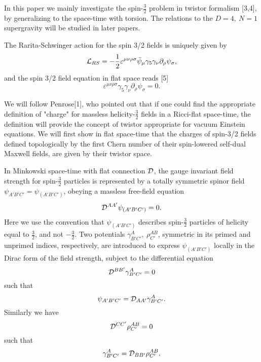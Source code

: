 \documentclass[a4paper,12pt]{article}
\begin{document}
In this paper we mainly investigate the spin-$\frac{3}{2}$ problem in twistor formalism [3,4], by generalizing to the space-time with torsion. The relations to the $D=4,\ N=1$ supergravity will be studied in later papers.

The Rarita-Schwinger action for the spin 3/2 fields is uniquely given by
\begin{equation}
{\cal L}_{RS}=-\frac{1}{2}\varepsilon^{\mu\nu\rho\sigma}{\bar\psi}_\mu\gamma_5\gamma_\nu\partial_\rho\psi_\sigma,
\end{equation}
and the spin 3/2 field equation in flat space reads [5]
\begin{equation}
\varepsilon^{\mu\nu\rho\sigma}\gamma_5\gamma_\nu\partial_\rho\psi_\sigma=0.
\end{equation}

We will follow Penrose[1], who pointed out that if one could find the appropriate definition of "charge" for massless helicity-$\frac{3}{2}$ fields in a Ricci-flat space-time, the definition will provide the concept of twistor appropriate for vacuum Einstein equations. We will first show in flat space-time that the charges of spin-3/2 fields defined topologically by the first Chern number of their spin-lowered self-dual Maxwell fields, are given by their twistor space.

In Minkowski space-time with flat connection ${\cal D}$, the gauge invariant field strength for spin-$\frac{3}{2}$ particles is represented by a totally symmetric spinor field $\psi_{A'B'C'}=\psi_{(A'B'C')}$, obeying a massless free-field equation
\begin{equation}
{\cal D}^{AA'}\psi_{(A'B'C')}=0.
\end{equation}
Here we use the convention that $\psi_{(A'B'C')}$ describes spin-$\frac{3}{2}$ particles of helicity equal to $\frac{3}{2}$, and not $-\frac{3}{2}$.
Two potentials $\gamma^A_{B'C'},\ \rho^{AB}_{C'}$, symmetric in its primed and unprimed indices, respectively, are introduced to express $\psi_{(A'B'C')}$ locally in the Dirac form of the field strength, subject to the differential equation\begin{equation}
{\cal D}^{BB'}\gamma^A_{B'C'}=0
\end{equation}
such that 
\begin{equation}\psi_{A'B'C'}={\cal D}_{AA'}\gamma^A_{B'C'}.\end{equation}
Similarly we have
\begin{equation}{\cal D}^{CC'}\rho^{AB}_{C'}=0
\end{equation}
such that 
\begin{equation}
\gamma^A_{B'C'}={\cal D}_{BB'}\rho^{AB}_{C'}.
\end{equation}
\end{document}
